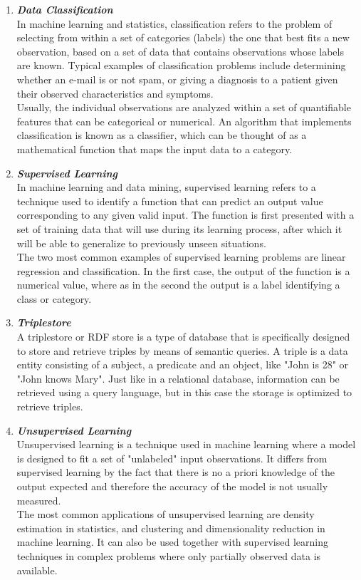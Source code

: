 \documentclass{article}
\begin{document}
\begin{enumerate}[label=(\alph*)]
\begin{enumerate}[label=\textbf{\arabic*.}]
            \item \textbf{\textit{Data Classification}}\\
In machine learning and statistics, classification refers to the problem of selecting from within a set of categories (labels) the one that best fits a new observation, based on a set of data that contains observations whose labels are known. Typical examples of classification problems include determining whether an e-mail is or not spam, or giving a diagnosis to a patient given their observed characteristics and symptoms.\\
Usually, the individual observations are analyzed within a set of quantifiable features that can be categorical or numerical. An algorithm that implements classification is known as a classifier, which can be thought of as a mathematical function that maps the input data to a category.
            
            \item \textbf{\textit{Supervised Learning}}\\
In machine learning and data mining, supervised learning refers to a technique used to identify a function that can predict an output value corresponding to any given valid input. The function is first presented with a set of training data that will use during its learning process, after which it will be able to generalize to previously unseen situations.\\
The two most common examples of supervised learning problems are linear regression and classification. In the first case, the output of the function is a numerical value, where as in the second the output is a label identifying a class or category.
            
            \item \textbf{\textit{Triplestore}}\\
A triplestore or RDF store is a type of database that is specifically designed to store and retrieve triples by means of semantic queries. A triple is a data entity consisting of a subject, a predicate and an object, like "John is 28" or "John knows Mary". Just like in a relational database, information can be retrieved using a query language, but in this case the storage is optimized to retrieve triples.
            
            \item \textbf{\textit{Unsupervised Learning}}\\
Unsupervised learning is a technique used in machine learning where a model is designed to fit a set of "unlabeled" input observations. It differs from supervised learning by the fact that there is no a priori knowledge of the output expected and therefore the accuracy of the model is not usually measured.\\
The most common applications of unsupervised learning are density estimation in statistics, and clustering and dimensionality reduction in machine learning. It can also be used together with supervised learning techniques in complex problems where only partially observed data is available.
            

\end{enumerate}
\end{enumerate}
\end{document}
